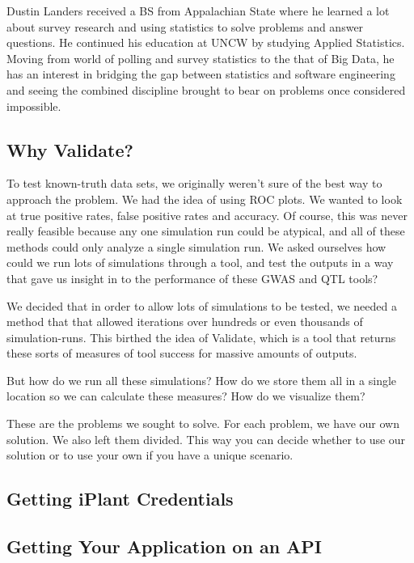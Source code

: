 \documentclass[twoside,a4paper]{refart}
\begin{document}
Dustin Landers received a BS from Appalachian State where he learned a lot about survey research and using statistics to solve problems and answer questions. He continued his education at UNCW by studying Applied Statistics. Moving from world of polling and survey statistics to the that of Big Data, he has an interest in bridging the gap between statistics and software engineering and seeing the combined discipline brought to bear on problems once considered impossible.


\subsection{Why Validate?}

To test known-truth data sets, we originally weren't sure of the best way to approach the problem. We had the idea of using ROC plots. We wanted to look at true positive rates, false positive rates and accuracy. Of course, this was never really feasible because any one simulation run could be atypical, and all of these methods could only analyze a single simulation run. We asked ourselves how could we run lots of simulations through a tool, and test the outputs in a way that gave us insight in to the performance of these GWAS and QTL tools?

We decided that in order to allow lots of simulations to be tested, we needed a method that that allowed iterations over hundreds or even thousands of simulation-runs. This birthed the idea of Validate, which is a tool that returns these sorts of measures of tool success for massive amounts of outputs.

But how do we run all these simulations? How do we store them all in a single location so we can calculate these measures? How do we visualize them?

These are the problems we sought to solve. For each problem, we have our own solution. We also left them divided. This way you can decide whether to use our solution or to use your own if you have a unique scenario.

\subsection{Getting iPlant Credentials}

\subsection{Getting Your Application on an API}
\end{document}
